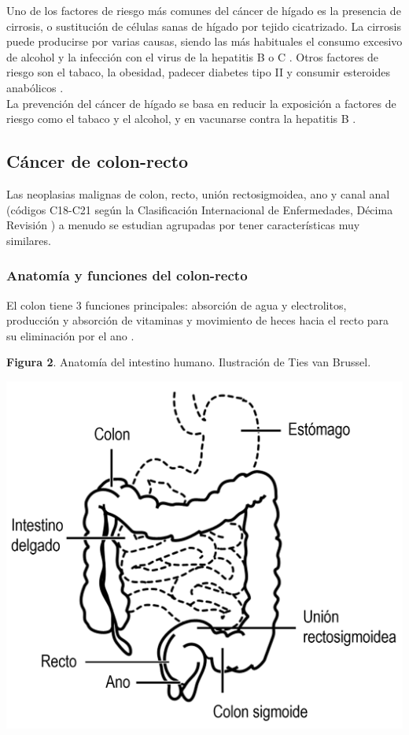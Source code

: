 Uno de los factores de riesgo más comunes del cáncer de hígado es la presencia de cirrosis, o sustitución de células sanas de hígado por tejido cicatrizado. La cirrosis puede producirse por varias causas, siendo las más habituales el consumo excesivo de alcohol y la infección con el virus de la hepatitis B o C \cite{AmericanCancerSociety2019}. Otros factores de riesgo son el tabaco, la obesidad, padecer diabetes tipo II y consumir esteroides anabólicos \cite{AmericanCancerSociety2019, Marrero2005}.\\

La prevención del cáncer de hígado se basa en reducir la exposición a factores de riesgo como el tabaco y el alcohol, y en vacunarse contra la hepatitis B \cite{AmericanCancerSociety2019}.


\subsection{Cáncer de colon-recto}

Las neoplasias malignas de colon, recto, unión rectosigmoidea, ano y canal anal (códigos C18-C21 según la Clasificación Internacional de Enfermedades, Décima Revisión \cite{ICD10, cie10es}) a menudo se estudian agrupadas por tener características muy similares.

\subsubsection{Anatomía y funciones del colon-recto}

El colon tiene 3 funciones principales: absorción de agua y electrolitos, producción y absorción de vitaminas y movimiento de heces hacia el recto para su eliminación por el ano \cite{Azzouz2020}.

\begin{center}
	\textbf{Figura 2}. Anatomía del intestino humano. Ilustración de Ties van Brussel.
\end{center}
\begin{center}
	\includegraphics[width=.70\textwidth]{figuras/02_anatomia_cr.png} \\
\end{center}

